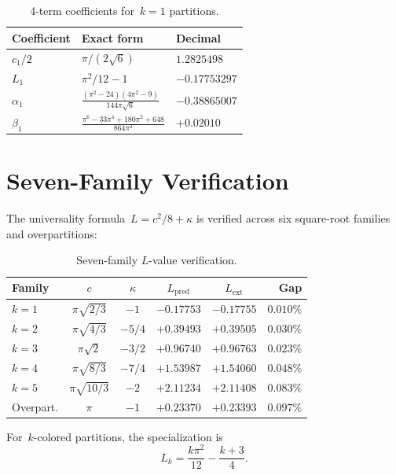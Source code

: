 \documentclass[11pt,a4paper]{article}
\begin{document}
\begin{table}[ht]
\centering
\caption{4-term coefficients for~$k=1$ partitions.}
\label{tab:4term}
\begin{tabular}{@{}lll@{}}
\toprule
Coefficient & Exact form & Decimal \\
\midrule
$c_1/2$ & $\pi/(2\sqrt{6})$ & $1.2825498$ \\
$L_1$ & $\pi^2/12 - 1$ & $-0.17753297$ \\
$\alpha_1$ & $\frac{(\pi^2-24)(4\pi^2-9)}{144\pi\sqrt{6}}$ & $-0.38865007$ \\
$\beta_1$ & $\frac{\pi^6-33\pi^4+180\pi^2+648}{864\pi^2}$ & $+0.02010$ \\
\bottomrule
\end{tabular}
\end{table}

\section{Seven-Family Verification}\label{sec:verification}

The universality formula~$L = c^2/8 + \kappa$ is verified across six square-root families and overpartitions:

\begin{table}[ht]
\centering
\caption{Seven-family $L$-value verification.}
\label{tab:7family}
\begin{tabular}{@{}lccccr@{}}
\toprule
Family & $c$ & $\kappa$ & $L_{\mathrm{pred}}$ & $L_{\mathrm{ext}}$ & Gap \\
\midrule
$k=1$ & $\pi\sqrt{2/3}$ & $-1$   & $-0.17753$ & $-0.17755$ & $0.010\%$ \\
$k=2$ & $\pi\sqrt{4/3}$ & $-5/4$ & $+0.39493$ & $+0.39505$ & $0.030\%$ \\
$k=3$ & $\pi\sqrt{2}$   & $-3/2$ & $+0.96740$ & $+0.96763$ & $0.023\%$ \\
$k=4$ & $\pi\sqrt{8/3}$ & $-7/4$ & $+1.53987$ & $+1.54060$ & $0.048\%$ \\
$k=5$ & $\pi\sqrt{10/3}$& $-2$   & $+2.11234$ & $+2.11408$ & $0.083\%$ \\
Overpart. & $\pi$        & $-1$   & $+0.23370$ & $+0.23393$ & $0.097\%$ \\
\bottomrule
\end{tabular}
\end{table}

For~$k$-colored partitions, the specialization is
\begin{equation}\label{eq:L_k}
  L_k = \frac{k\pi^2}{12} - \frac{k+3}{4}.
\end{equation}
\end{document}

